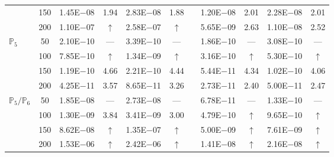\begin{table}[H]
{\begin{tabular}{@{}l c c c c c c c c c c@{}}
 & 150 & 1.45E$-$08 & 1.94  & 2.83E$-$08 & 1.88 &  & 1.20E$-$08 & 2.01 & 2.28E$-$08 & 2.01\\
 & 200 & 1.10E$-$07 & $\uparrow$  & 2.58E$-$07 & $\uparrow$ &  & 5.65E$-$09 & 2.63 & 1.10E$-$08 & 2.52\\
\midrule
\multirow{4}{*}{$\mathbb{P}_{5}$}
 & 50 & 2.10E$-$10 & ---  & 3.39E$-$10 & --- &  & 1.86E$-$10 & --- & 3.08E$-$10 & ---\\
 & 100 & 7.85E$-$10 & $\uparrow$  & 1.34E$-$09 & $\uparrow$ &  & 3.16E$-$10 & $\uparrow$ & 5.30E$-$10 & $\uparrow$\\
 & 150 & 1.19E$-$10 & 4.66  & 2.21E$-$10 & 4.44 &  & 5.44E$-$11 & 4.34 & 1.02E$-$10 & 4.06\\
 & 200 & 4.25E$-$11 & 3.57  & 8.65E$-$11 & 3.26 &  & 2.73E$-$11 & 2.40 & 5.00E$-$11 & 2.47\\
\midrule
\multirow{4}{*}{$\mathbb{P}_{5}/\mathbb{P}_{6}$}
 & 50 & 1.85E$-$08 & ---  & 2.73E$-$08 & --- &  & 6.78E$-$11 & --- & 1.33E$-$10 & ---\\
 & 100 & 1.30E$-$09 & 3.84  & 3.41E$-$09 & 3.00 &  & 4.79E$-$10 & $\uparrow$ & 9.65E$-$10 & $\uparrow$\\
 & 150 & 8.62E$-$08 & $\uparrow$  & 1.35E$-$07 & $\uparrow$ &  & 5.00E$-$09 & $\uparrow$ & 7.61E$-$09 & $\uparrow$\\
 & 200 & 1.53E$-$06 & $\uparrow$  & 2.42E$-$06 & $\uparrow$ &  & 1.41E$-$08 & $\uparrow$ & 2.16E$-$08 & $\uparrow$\\
\bottomrule
\end{tabular}}
\label{none}
\end{table}
